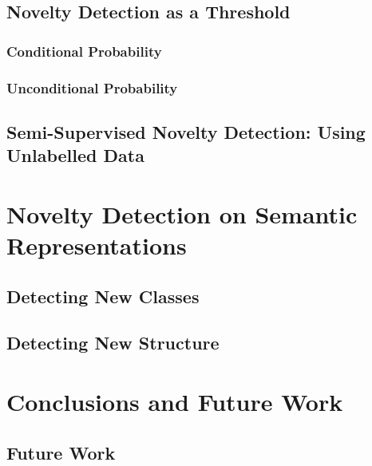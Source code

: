 \section{Novelty Detection as a Threshold}
\subsection{Conditional Probability}
\subsection{Unconditional Probability}

\section{Semi-Supervised Novelty Detection: Using Unlabelled Data}

\chapter{Novelty Detection on Semantic Representations}\label{chap:novelty}
\section{Detecting New Classes} 
\section{Detecting New Structure}

\chapter{Conclusions and Future Work}\label{chap:conclusions}
\section{Future Work}

